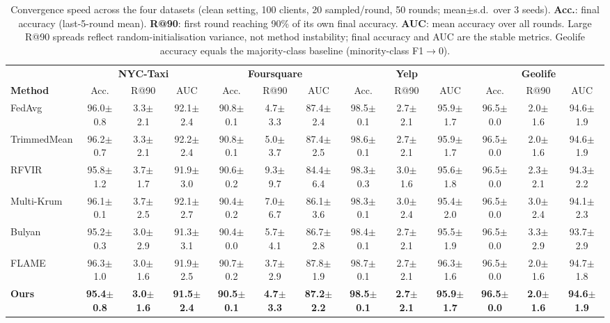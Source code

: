 \begin{table}[t]
\centering
\caption{Convergence speed across the four datasets (clean setting, 100 clients, 20 sampled/round, 50 rounds; mean$\pm$s.d.\ over 3 seeds). \textbf{Acc.}: final accuracy (last-5-round mean). \textbf{R@90}: first round reaching 90\% of its own final accuracy. \textbf{AUC}: mean accuracy over all rounds. Large R@90 spreads reflect random-initialisation variance, not method instability; final accuracy and AUC are the stable metrics. Geolife accuracy equals the majority-class baseline (minority-class F1$\to$0).}
\label{tab:convergence}
\small
\begin{tabular}{lcccccccccccc}
\toprule
 & \multicolumn{3}{c}{\textbf{NYC-Taxi}} & \multicolumn{3}{c}{\textbf{Foursquare}} & \multicolumn{3}{c}{\textbf{Yelp}} & \multicolumn{3}{c}{\textbf{Geolife}} \\
\textbf{Method} & Acc. & R@90 & AUC & Acc. & R@90 & AUC & Acc. & R@90 & AUC & Acc. & R@90 & AUC \\
\midrule
FedAvg & 96.0$\pm$0.8 & 3.3$\pm$2.1 & 92.1$\pm$2.4 & 90.8$\pm$0.1 & 4.7$\pm$3.3 & 87.4$\pm$2.4 & 98.5$\pm$0.1 & 2.7$\pm$2.1 & 95.9$\pm$1.7 & 96.5$\pm$0.0 & 2.0$\pm$1.6 & 94.6$\pm$1.9 \\
TrimmedMean & 96.2$\pm$0.7 & 3.3$\pm$2.1 & 92.2$\pm$2.4 & 90.8$\pm$0.1 & 5.0$\pm$3.7 & 87.4$\pm$2.5 & 98.6$\pm$0.1 & 2.7$\pm$2.1 & 95.9$\pm$1.7 & 96.5$\pm$0.0 & 2.0$\pm$1.6 & 94.6$\pm$1.9 \\
RFVIR & 95.8$\pm$1.2 & 3.7$\pm$1.7 & 91.9$\pm$3.0 & 90.6$\pm$0.2 & 9.3$\pm$9.7 & 84.4$\pm$6.4 & 98.3$\pm$0.3 & 3.0$\pm$1.6 & 95.6$\pm$1.8 & 96.5$\pm$0.0 & 2.3$\pm$2.1 & 94.3$\pm$2.2 \\
Multi-Krum & 96.1$\pm$0.1 & 3.7$\pm$2.5 & 92.1$\pm$2.7 & 90.4$\pm$0.2 & 7.0$\pm$6.7 & 86.1$\pm$3.6 & 98.3$\pm$0.1 & 3.0$\pm$2.4 & 95.4$\pm$2.0 & 96.5$\pm$0.0 & 3.0$\pm$2.4 & 94.1$\pm$2.3 \\
Bulyan & 95.2$\pm$0.3 & 3.0$\pm$2.9 & 91.3$\pm$3.1 & 90.4$\pm$0.0 & 5.7$\pm$4.1 & 86.7$\pm$2.8 & 98.4$\pm$0.1 & 2.7$\pm$2.1 & 95.5$\pm$1.9 & 96.5$\pm$0.0 & 3.3$\pm$2.9 & 93.7$\pm$2.9 \\
FLAME & 96.3$\pm$1.0 & 3.0$\pm$1.6 & 91.9$\pm$2.5 & 90.7$\pm$0.2 & 3.7$\pm$2.9 & 87.8$\pm$1.9 & 98.7$\pm$0.1 & 2.7$\pm$2.1 & 96.3$\pm$1.6 & 96.5$\pm$0.0 & 2.0$\pm$1.6 & 94.7$\pm$1.8 \\
\midrule
\textbf{Ours} & \textbf{95.4$\pm$0.8} & \textbf{3.0$\pm$1.6} & \textbf{91.5$\pm$2.4} & \textbf{90.5$\pm$0.1} & \textbf{4.7$\pm$3.3} & \textbf{87.2$\pm$2.2} & \textbf{98.5$\pm$0.1} & \textbf{2.7$\pm$2.1} & \textbf{95.9$\pm$1.7} & \textbf{96.5$\pm$0.0} & \textbf{2.0$\pm$1.6} & \textbf{94.6$\pm$1.9} \\
\bottomrule
\end{tabular}
\end{table}
